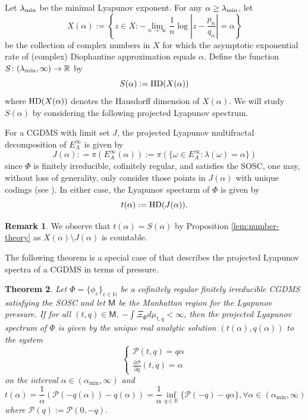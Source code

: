 \documentclass[11pt]{amsart}
\theoremstyle{plain}
\newtheorem{theorem}{Theorem}[section]
\theoremstyle{definition}
\newtheorem{remark}[theorem]{Remark}
\renewcommand\~{\tilde}%
\newcommand{\om}{\ensuremath{\omega}}
\newcommand{\cP}{\ensuremath{\mathcal{P}}}
\newcommand{\NN}{\ensuremath{\mathbb N}}%
\newcommand{\RR}{\ensuremath{\mathbb R}}%
\numberwithin{equation}{section}
\begin{document}
Let $\lambda_{\rm min}$ be the minimal Lyapunov exponent. For any $\alpha \ge \lambda_{\rm min}$, let
$$X(\alpha):=\left\{z \in X : -\lim_{n \to \infty} \frac{1}{n}\log \left|z - \frac{p_n}{q_n}\right| = \alpha \right\}$$ 
be the collection of complex numbers in $X$ for which the asymptotic exponential rate of (complex) Diophantine approximation equals $\alpha$. Define the function $S \colon (\lambda_{\rm min}, \infty) \to \mathbb R$ by
$$S(\alpha):= {\rm HD}(X(\alpha))$$
where ${\rm HD}(X(\alpha))$ denotes the Hausdorff dimension of $X(\alpha)$. We will study $S(\alpha)$ by considering the following projected Lyapunov spectrum.


For a CGDMS with limit set $J$, the projected Lyapunov multifractal decomposition of $E_A^{\infty}$ is given by 
$$
    J(\alpha): = \pi(E_A^{\infty}(\alpha)) :=\pi(\{\om\in E_A^{\infty} : \lambda(\om)=\alpha\})
$$
since $\Phi$ is finitely irreducible, cofinitely regular, and satisfies the SOSC, one may, without loss of generality, only consider those points in $J(\alpha)$ with unique codings (see \cite[Proposition 6.5]{NDDis}). In either case, the Lyapunov specturm of $\Phi$ is given by 
$$
    t(\alpha):= {\rm HD}(J(\alpha)).
$$

\begin{remark}\label{rmk:3.7}
We observe that $t(\alpha) = S(\alpha)$ by Proposition \ref{lem:number-theory} as $X(\alpha)\setminus J(\alpha)$ is countable. 
\end{remark}

The following theorem is a special case of \cite[Theorem 3.1 (see also Theorem 7.1)]{NDDis} that describes the projected Lyapunov spectra of a CGDMS in terms of pressure.

\begin{theorem} \label{thm:main-3}
Let $\Phi =\{\phi_e\}_{e\in \NN}$ be a cofinitely regular finitely irreducible CGDMS satisfying the SOSC and let $\mathsf{M}$ be the Manhattan region for the Lyapunov pressure. If for all $(t,q)\in \mathsf{M}$, $-\int \Xi_\Phi d \mu_{t,q}<\infty$, then the projected Lyapunov spectrum of $\Phi$ is given by the unique real analytic solution $(t(\alpha),q(\alpha))$ to the system 
$$
\begin{cases} \cP(t,q) =q\alpha\\\frac{\partial \cP}{\partial q}(t,q) = \alpha \end{cases}
$$ on the interval $\alpha\in (\alpha_{\min},\infty)$ and
$$
t(\alpha) = \frac{1}{\alpha}(\cP(-q(\alpha))-q(\alpha)) = \frac{1}{\alpha}\inf_{q\in\RR}\{\cP(-q)-q\alpha\}, \forall \alpha\in (\alpha_{\min},\infty)
$$
where $\cP(q):= \cP(0,-q)$.
\end{theorem}
\end{document}
